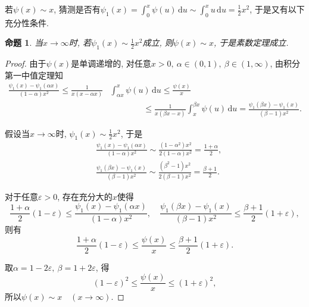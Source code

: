 \documentclass[12pt, a4paper, oneside]{ctexart}
\newtheorem{proposition}{命题}[section]
\numberwithin{equation}{section}  %
\let\leq=\leqslant %
\let\epsilon=\varepsilon %
\def\d{\mathrm{d}}          %
\begin{document}
若$\psi(x)\sim x$, 猜测是否有$\psi_1(x) = \int_0^x \psi(u)\,\d u\sim \int_0^xu\,\d u = \frac{1}{2}x^2$, 于是又有以下充分性条件.
\begin{proposition}\label{prop-goto-psi1}
    当$x\to \infty$时, 若$\psi_1(x)\sim\frac{1}{2}x^2$成立, 则$\psi(x)\sim x$, 于是素数定理成立.
\end{proposition}
\begin{proof}
    由于$\psi(x)$是单调递增的, 对任意$x>0,\ \alpha \in (0, 1),\ \beta\in (1,\infty)$, 由积分第一中值定理知
    \begin{equation*}
        \begin{aligned}
            \frac{\psi_1(x)-\psi_1(\alpha x)}{(1-\alpha)x^2} \leq \frac{1}{x(x-\alpha x)}&\int_{\alpha x}^x\psi(u)\,\d u\leq \frac{\psi(x)}{x}\\
            &\qquad\qquad\leq \frac{1}{x(\beta x - x)}\int_x^{\beta x}\psi(u)\,\d u = \frac{\psi_1(\beta x)-\psi_1(x)}{(\beta -1)x^2}.
        \end{aligned}
    \end{equation*}

    假设当$x\to \infty$时, $\psi_1(x)\sim \frac{1}{2}x^2$, 于是
    \begin{equation*}
        \begin{aligned}
            &\ \frac{\psi_1(x)-\psi_1(\alpha x)}{(1-\alpha)x^2}\sim \frac{(1-\alpha^2)x^2}{2(1-\alpha)x^2} = \frac{1+\alpha}{2},\\
            &\ \frac{\psi_1(\beta x)-\psi_1(x)}{(\beta -1)x^2}\sim \frac{(\beta^2-1)x^2}{2(\beta - 1)x^2} = \frac{\beta+1}{2}.
        \end{aligned}
    \end{equation*}

    对于任意$\epsilon > 0$, 存在充分大的$x$使得
    \begin{equation*}
        \frac{1+\alpha}{2}(1-\epsilon)\leq \frac{\psi_1(x)-\psi_1(\alpha x)}{(1-\alpha)x^2},\quad\frac{\psi_1(\beta x)-\psi_1(x)}{(\beta-1)x^2} \leq \frac{\beta+1}{2}(1+\epsilon),
    \end{equation*}
    则有
    \begin{equation*}
        \frac{1+\alpha}{2}(1-\epsilon)\leq \frac{\psi(x)}{x}\leq \frac{\beta+1}{2}(1+\epsilon).
    \end{equation*}

    取$\alpha = 1-2\epsilon,\ \beta = 1+2\epsilon$, 得
    \begin{equation*}
        (1-\epsilon)^2\leq \frac{\psi(x)}{x}\leq (1+\epsilon)^2,
    \end{equation*}
    所以$\psi(x)\sim x\quad (x\to \infty)$.
\end{proof}
\end{document}
